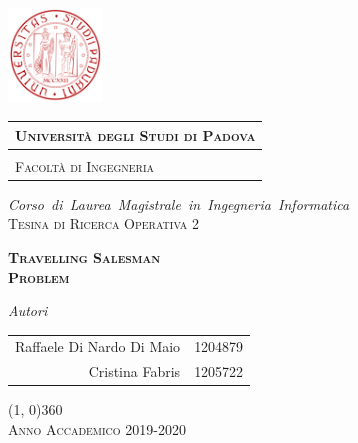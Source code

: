 \documentclass[a4paper, 12pt, twoside, openright]{book}
\begin{document}
\frontmatter

\begin{titlepage} %
\begin{center}

\hspace{0.5cm}
\begin{minipage}{.20\textwidth}
  \includegraphics[height=2.5cm]{Images/UNIPD}
\end{minipage}\begin{minipage}{.90\textwidth}
  \begin{table}[H]
  \begin{tabular}{l}
  \scshape{\Large{\bfseries{Università degli Studi di Padova}}} \\
  \hline \\
  \scshape{\Large{Facoltà di Ingegneria}} \\
  \end{tabular}
  \end{table}
\end{minipage}

\vspace{1cm}
\emph{\Large{Corso~di~Laurea~Magistrale~in~Ingegneria~Informatica}} \\
\vspace{3cm}
\scshape{\Large{Tesina di Ricerca Operativa 2}} \\
\end{center}

\vspace{1cm}
\begin{center}
\scshape{\Large{\bfseries{Travelling Salesman}}}\\
\scshape{\Large{\bfseries{Problem}}}
\end{center}

\vspace{3.5cm}

\begin{center}
\emph{Autori}
\vspace{0.2cm}
\begin{table}[h]
\centering
\begin{tabular}{rl}
\vspace{0.2cm}
{Raffaele Di Nardo Di Maio} & {1204879}\\
{Cristina Fabris} & {1205722}\\
\end{tabular}
\end{table}

\end{center}

\vfill
\begin{center}
\hspace{-0.2cm}
\line(1, 0){360}\\
\textsc{Anno Accademico 2019-2020}
\end{center}
\end{titlepage}
\end{document}
